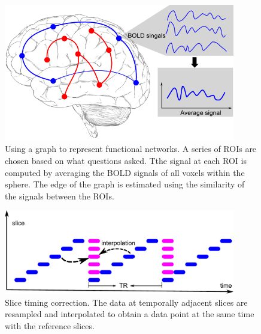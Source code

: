 \begin{figure}[ptb]
  \centering
  \includegraphics[width=0.9\textwidth]{figures/c2/brain_graph}
  \caption{Using a graph to represent functional networks. A series of ROIs are chosen
    based on what questions  asked. Tthe signal at each ROI is computed by
    averaging the BOLD signals of all voxels within the sphere. The edge
    of the graph is estimated using the similarity of the signals between the
    ROIs. }
  \label{fig:brain_graph}
\end{figure}

\begin{figure}[ptb]
  \centering
  \includegraphics[width=0.9\textwidth]{figures/c2/slicetiming}
  \caption{Slice timing correction. The data at temporally adjacent slices are
    resampled and interpolated to obtain a data point at the same time with the
    reference slices.}
  \label{fig:slicetiming}
\end{figure}

